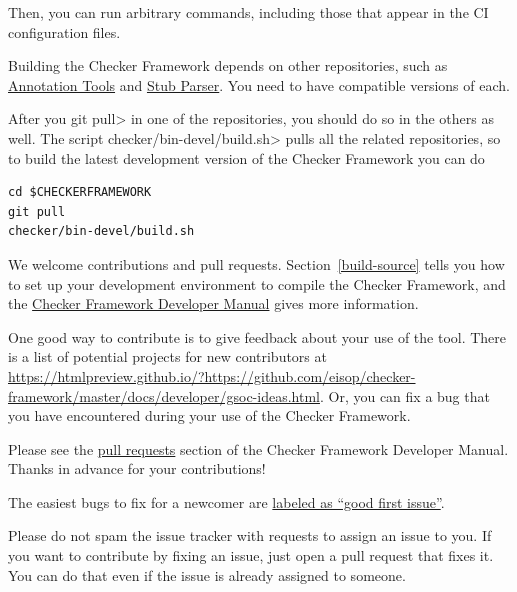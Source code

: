 Then, you can run arbitrary commands, including those that appear in the
CI configuration files.



Building the Checker Framework depends on other repositories, such as
\href{https://github.com/eisop/annotation-tools/}{Annotation Tools} and
\href{https://github.com/eisop/stubparser/}{Stub Parser}.
You need to have compatible versions of each.

After you \<git pull> in one of the repositories, you should do so in the
others as well.  The script \<checker/bin-devel/build.sh> pulls all the
related repositories, so to build the latest development version of the
Checker Framework you can do

\begin{Verbatim}
cd $CHECKERFRAMEWORK
git pull
checker/bin-devel/build.sh
\end{Verbatim}



We welcome contributions and pull requests.  Section~\ref{build-source}
tells you how to set up your development environment to compile the Checker
Framework, and the
\href{https://htmlpreview.github.io/?https://github.com/eisop/checker-framework/master/docs/developer/developer-manual.html}{Checker
  Framework Developer Manual} gives more information.

One good way to contribute is to give feedback about your use of the tool.
There is a list
  of potential projects for new contributors at \url{https://htmlpreview.github.io/?https://github.com/eisop/checker-framework/master/docs/developer/gsoc-ideas.html}.
Or, you can fix a bug that
you have encountered during your use of the Checker Framework.



Please see the
\href{https://htmlpreview.github.io/?https://github.com/eisop/checker-framework/master/docs/developer/developer-manual.html#pull-requests}{pull
  requests} section of the Checker Framework Developer Manual.
Thanks in advance for your contributions!

The easiest bugs to fix for a newcomer are
\href{https://github.com/eisop/checker-framework/issues?q=is%3Aopen+is%3Aissue+label%3A%22good+first+issue%22}{labeled
  as ``good first issue''}.

Please do not spam the issue tracker with requests to assign an issue to
you.  If you want to contribute by fixing an issue, just open a pull
request that fixes it.  You can do that even if the issue is already
assigned to someone.

